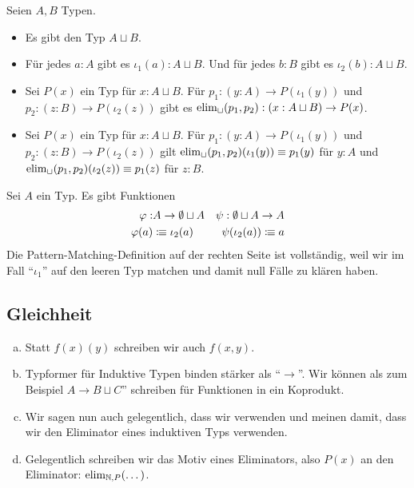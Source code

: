 \begin{regeln}
Seien $A,B$ Typen.
\begin{itemize}
\item Es gibt den Typ $A\sqcup B$.
\item Für jedes $a:A$ gibt es $\iota_1(a):A\sqcup B$.
  Und für jedes $b:B$ gibt es $\iota_2(b):A\sqcup B$.
\item Sei $P(x)$ ein Typ für $x:A\sqcup B$.
  Für $p_1:(y:A)\to P(\iota_1(y))$ und $p_2:(z:B)\to P(\iota_2(z))$
  gibt es $\mathrm{elim}_\sqcup(p_1,p_2):(x:A\sqcup B)\to P(x)$.
\item Sei $P(x)$ ein Typ für $x:A\sqcup B$.
  Für $p_1:(y:A)\to P(\iota_1(y))$ und $p_2:(z:B)\to P(\iota_2(z))$
  gilt $\mathrm{elim}_\sqcup(p_1,p_2)(\iota_1(y))\equiv p_1(y)$ für $y:A$
  und  $\mathrm{elim}_\sqcup(p_1,p_2)(\iota_2(z))\equiv p_1(z)$ für $z:B$.
\end{itemize}
\end{regeln}

\begin{bemerkung}
Sei $A$ ein Typ. Es gibt Funktionen
  \begin{align*}
    \varphi: &A\to \emptyset\sqcup A &\psi:\emptyset\sqcup A \to A \\
    \varphi(a)&\vcentcolon\mspace{-1.2mu}\equiv \iota_2(a) &\psi(\iota_2(a))\vcentcolon\mspace{-1.2mu}\equiv a 
\end{align*}
Die Pattern-Matching-Definition auf der rechten Seite ist vollständig, weil wir im Fall ``$\iota_1$'' auf den leeren Typ matchen und damit null Fälle zu klären haben.
\end{bemerkung}

\subsection{Gleichheit}
\begin{konvention}
\begin{enumerate}[(a)]
\item Statt $f(x)(y)$ schreiben wir auch $f(x,y)$.
\item Typformer für Induktive Typen binden stärker als ``$\to$''. Wir können als zum Beispiel $A\to B\sqcup C$'' schreiben für Funktionen in ein Koprodukt.
\item Wir sagen nun auch gelegentlich, dass wir  verwenden und meinen damit, dass wir den Eliminator eines induktiven Typs verwenden.
\item Gelegentlich schreiben wir das Motiv eines Eliminators, also $P(x)$ an den Eliminator: $\mathrm{elim}_{\mathbb{N},P}(\dots)$.
\end{enumerate}
\end{konvention}


